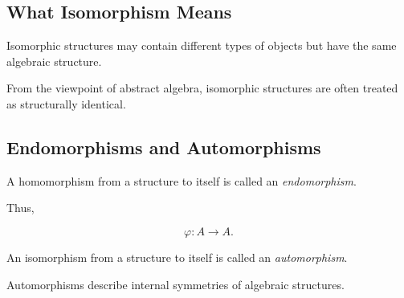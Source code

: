 \subsection{What Isomorphism Means}
\label{subsec:meaning-isomorphism}

Isomorphic structures may contain different types of objects but have the same
algebraic structure.

\begin{center}
\end{center}

From the viewpoint of abstract algebra, isomorphic structures are often
treated as structurally identical.

\subsection{Endomorphisms and Automorphisms}
\label{subsec:endomorphisms-automorphisms}

A homomorphism from a structure to itself is called an \emph{endomorphism}.

Thus,

\[ \varphi:A\to A. \]

An isomorphism from a structure to itself is called an \emph{automorphism}.

Automorphisms describe internal symmetries of algebraic structures.

